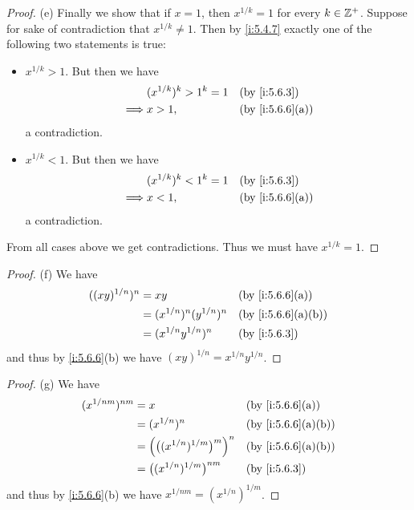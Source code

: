 \begin{proof}{(e)}
  Finally we show that if \(x = 1\), then \(x^{1 / k} = 1\) for every \(k \in \mathbb{Z}^+\).
  Suppose for sake of contradiction that \(x^{1 / k} \neq 1\).
  Then by \cref{i:5.4.7} exactly one of the following two statements is true:
  \begin{itemize}
    \item \(x^{1 / k} > 1\).
          But then we have
          \begin{align*}
                     & (x^{1 / k})^k > 1^k = 1 &  & \by{i:5.6.3}    \\
            \implies & x > 1,                  &  & \by{i:5.6.6}[a]
          \end{align*}
          a contradiction.
    \item \(x^{1 / k} < 1\).
          But then we have
          \begin{align*}
                     & (x^{1 / k})^k < 1^k = 1 &  & \by{i:5.6.3}    \\
            \implies & x < 1,                  &  & \by{i:5.6.6}[a]
          \end{align*}
          a contradiction.
  \end{itemize}
  From all cases above we get contradictions.
  Thus we must have \(x^{1 / k} = 1\).
\end{proof}

\begin{proof}{(f)}
  We have
  \begin{align*}
    ((xy)^{1 / n})^n & = xy                          &  & \by{i:5.6.6}[a]   \\
                     & = (x^{1 / n})^n (y^{1 / n})^n &  & \by{i:5.6.6}[a,b] \\
                     & = (x^{1 / n} y^{1 / n})^n     &  & \by{i:5.6.3}
  \end{align*}
  and thus by \cref{i:5.6.6}(b) we have \((xy)^{1 / n} = x^{1 / n} y^{1 / n}\).
\end{proof}

\begin{proof}{(g)}
  We have
  \begin{align*}
    (x^{1 / nm})^{nm} & = x                                           &  & \by{i:5.6.6}[a]   \\
                      & = (x^{1 / n})^n                               &  & \by{i:5.6.6}[a,b] \\
                      & = \Big(\big((x^{1 / n})^{1 / m}\big)^m\Big)^n &  & \by{i:5.6.6}[a,b] \\
                      & = \big((x^{1 / n})^{1 / m}\big)^{nm}          &  & \by{i:5.6.3}
  \end{align*}
  and thus by \cref{i:5.6.6}(b) we have \(x^{1 / nm} = (x^{1 / n})^{1 / m}\).
\end{proof}

